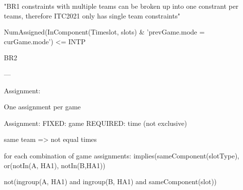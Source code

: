 "BR1 constraints with multiple teams can be broken up into one constrant per teams, therefore ITC2021 only has single team constraints"

NumAssigned(InComponent(Timeslot, slots) \& 'prevGame.mode = curGame.mode') <= INTP

BR2

---

Assignment:

One assignment per game

Assignment:
FIXED: game
REQUIRED: time (not exclusive)

same team => not equal times

for each combination of game assignments:
implies(sameComponent(slotType), or(notIn(A, HA1), notIn(B,HA1))

not(ingroup(A, HA1) and ingroup(B, HA1) and sameComponent(slot))










